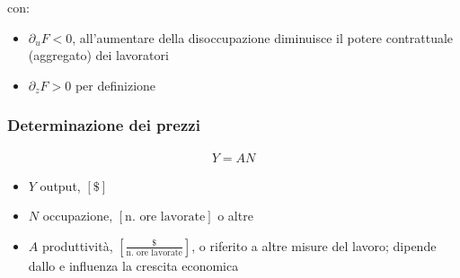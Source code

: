 \documentclass[letterpaper,10pt,italian]{jupyterBook}
\begin{document}
\sphinxAtStartPar
con:
\begin{itemize}
\item {} 
\sphinxAtStartPar
\(\partial_u F < 0\), all’aumentare della disoccupazione diminuisce il potere contrattuale (aggregato) dei lavoratori

\item {} 
\sphinxAtStartPar
\(\partial_z F > 0\) per definizione

\end{itemize}
\subsubsection*{Determinazione dei prezzi}
\begin{equation*}
\begin{split}Y = A N\end{split}
\end{equation*}\begin{itemize}
\item {} 
\sphinxAtStartPar
\(Y\) output, \(\left[\$\right]\)

\item {} 
\sphinxAtStartPar
\(N\) occupazione, \(\left[\text{n. ore lavorate}\right]\) o altre {\hyperref[\detokenize{ch/macro:economics-hs-macro-medium-run-jobs-market-stats}]{}}

\item {} 
\sphinxAtStartPar
\(A\) produttività, \(\left[\frac{\$}{\text{n. ore lavorate}}\right]\), o riferito a altre misure del lavoro; dipende dallo {\hyperref[\detokenize{ch/macro:economics-hs-macro-long-run-progress}]{}} e influenza la crescita economica

\end{itemize}
\end{document}
